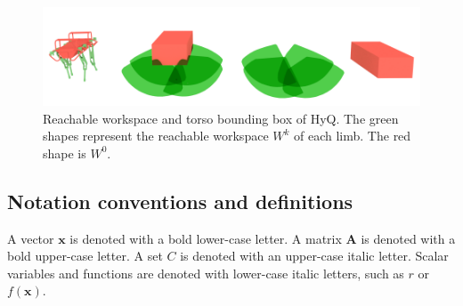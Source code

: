 \begin{figure}
  \centering
  \includegraphics[width=0.95\linewidth]{figures/HyQ_roms}
  \caption{
           Reachable workspace and torso bounding box of HyQ. The green shapes represent the reachable workspace $W^k$ of each limb. The red shape is $W^0$.}
		   \label{fig:HyQ_roms}
\end{figure}


\subsection{Notation conventions and definitions} \label{notations}

A vector  $\mathbf{x}$ is denoted with a bold lower-case letter.
A matrix $\mathbf{A}$ is denoted with a bold upper-case letter.
A set $C$ is denoted with an upper-case italic letter.
Scalar variables and functions are denoted with lower-case italic letters, such as
$r$ or $f(\textbf{x})$.



